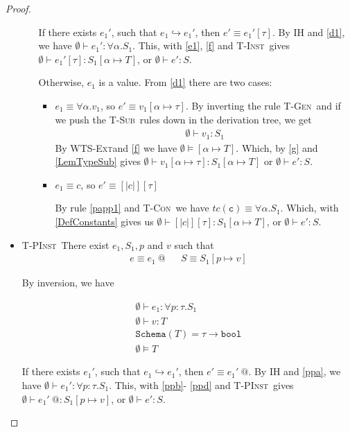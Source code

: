 \documentclass[10pt,a4paper]{article}
\makeatletter
\newcommand\tbbool{\ensuremath{\texttt{bool}}}
\newcommand\tc[1]{\ensuremath{tc\left(\texttt{#1}\right)}}
\newcommand\tpabs[3]{\ensuremath{\forall #1 : #2 . #3}}
\newcommand\ttabs[2]{\ensuremath{\forall #1 . #2}}
\newcommand\etabs[2]{\ensuremath{\forall #1 . #2}}
\newcommand\etapp[2]{\ensuremath{{#1} \left[ {#2}\right]}}
\newcommand\epapp[1]{\ensuremath{{#1} \ @}}
\newcommand\tsub{\rulename{T-Sub}}
\newcommand\tcon{\rulename{T-Con}}
\newcommand\tinst{\rulename{T-Inst}}
\newcommand\tgen{\rulename{T-Gen}}
\newcommand\tpinst{\rulename{T-PInst}}
\newcommand\wstExt{\rulename{WTS-Ext}}
\newcommand\isWellFormed[2]{\ensuremath{{#1}\models {#2}}}
\newcommand\hastype[3]{\ensuremath{{#1}\vdash {#2}:{#3}}}
\newcommand\eval[2]{\ensuremath{{#1}\hookrightarrow {#2}}}
\newcommand\hastypeEmp[2]{\hastype{\emptyset}{#1}{#2}}
\newcommand\rulename[1]{\textsc{#1}}
\newcommand\sch[1]{\ensuremath{\texttt{Schema}\left(#1\right)}}
\newcommand\sub[2]{\ensuremath{\left[ #1 \mapsto #2 \right]}}
\makeatother
\begin{document}
\begin{proof}
\begin{itemize}
\begin{itemize}
If there exists $e_1'$, such that \eval{e_1}{e_1'}, 
then $e' \equiv \etapp{e_1'}{\tau}$.
By IH and \ref{d1}, we have \hastypeEmp{e_1'}{\ttabs{\alpha}{S_1}}.
This, with \ref{e1}, \ref{f} and \tinst\ 
gives \hastypeEmp{\etapp{e_1'}{\tau}}{S_1\sub{\alpha}{T}}, or
\hastypeEmp{e'}{S}.

Otherwise, $e_1$ is a value. From \ref{d1} there are two cases:

\begin{itemize}
\item $e_1 \equiv \etabs{\alpha}{v_{1}}$, so $e' \equiv v_1\sub{\alpha}{\tau}$.
By inverting the rule \tgen\ and if we push the \tsub\ rules down in the derivation tree,
we get 
\begin{align}
\hastypeEmp{v_1}{S_1} \label{g}
\end{align}
By \wstExt and \ref{f} we have \isWellFormed{\emptyset}{\sub{\alpha}{T}}.
Which, by \ref{g} and \ref{LemTypeSub} gives 
\hastypeEmp{v_1\sub{\alpha}{\tau}}{S_1\sub{\alpha}{T}} or
\hastypeEmp{e'}{S}.
 
\item $e_1 \equiv c$, 
so $e' \equiv \etapp{[|c|]}{\tau}$
			
			By rule \ref{papp1} and \tcon \ we have 
			$\tc{c} \equiv \ttabs{\alpha}{S_1}$.
			Which, with \ref{DefConstants} gives us 
			\hastypeEmp{\etapp{[|c|]}{\tau}}{{S_1\sub{\alpha}{T}}}, or 
			\hastypeEmp{e'}{S}. 
\end{itemize}

\end{itemize}



\item \tpinst\ There exist $e_1, S_1, p$ and $v$ such that
\begin{align*}
e \equiv \epapp{e_1} && S \equiv S_1\sub{p}{v}
\end{align*}

By inversion, we have

\begin{align}
\hastypeEmp{e_1}{\tpabs{p}{\tau}{S_1}} \label{ppa}\\
\hastypeEmp{v}{T} \label{ppb}\\
\sch{T} = \tau \rightarrow \tbbool \label{ppc}\\
\isWellFormed{\emptyset}{T} \label{ppd}
\end{align} 

If there exists $e_1'$, such that \eval{e_1}{e_1'}, 
then $e' \equiv \epapp{e_1'}$.
By IH and \ref{ppa}, we have \hastypeEmp{e_1'}{\tpabs{p}{\tau}{S_1}}.
This, with \ref{ppb}- \ref{ppd} and \tpinst\ 
gives \hastypeEmp{\epapp{e_1'}}{S_1\sub{p}{v}}, or
\hastypeEmp{e'}{S}.


\end{itemize}
\end{proof}
\end{document}
